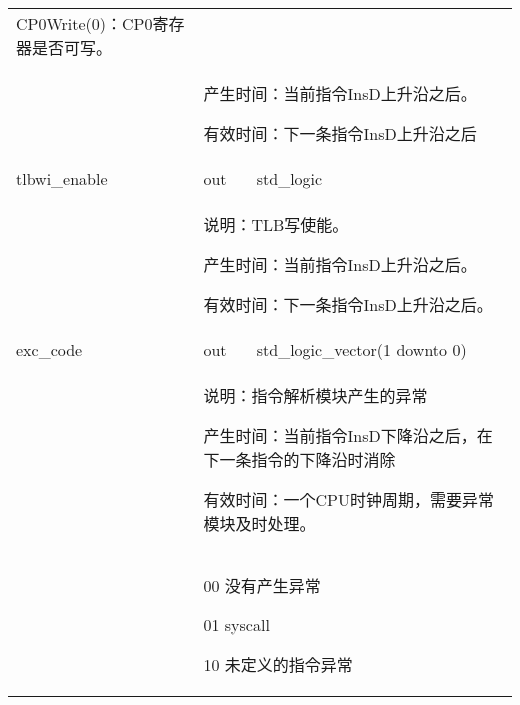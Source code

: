 \begin{tabularx}{\textwidth}{lll}
{                CP0Write(0)：CP0寄存器是否可写。
            } \\
            &
            \multicolumn{2}{X}{
                产生时间：当前指令InsD上升沿之后。

                有效时间：下一条指令InsD上升沿之后 
            } \\
            \midrule
            tlbwi\_enable   & out       & std\_logic \\
            \cmidrule(l){2-3}
            &
            \multicolumn{2}{X}{
                说明：TLB写使能。

                产生时间：当前指令InsD上升沿之后。

                有效时间：下一条指令InsD上升沿之后。
            } \\
            \midrule
            exc\_code   & out       & std\_logic\_vector(1 downto 0) \\
            \cmidrule(l){2-3}
            &
            \multicolumn{2}{X}{
                说明：指令解析模块产生的异常

                产生时间：当前指令InsD下降沿之后，在下一条指令的下降沿时消除

                有效时间：一个CPU时钟周期，需要异常模块及时处理。
            } \\
            &
            \multicolumn{2}{X}{
                00 没有产生异常

                01 syscall

                10 未定义的指令异常
            } \\
            \bottomrule
            \end{tabularx}
